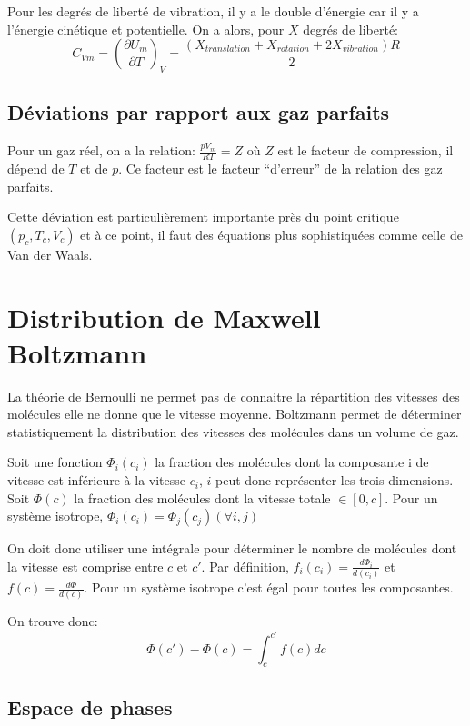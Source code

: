Pour les degrés de liberté de vibration, il y a le double d'énergie car il y a l'énergie cinétique et potentielle.
On a alors, pour $X$ degrés de liberté:
$$ C_{Vm} = (\frac{\partial U_m}{\partial T})_V = \frac{(X_{translation} + X_{rotation} + 2X_{vibration})R}{2}$$ 

\subsection{Déviations par rapport aux gaz parfaits}
Pour un gaz réel, on a la relation: $\frac{pV_m}{RT} = Z$ où $Z$ est le facteur de compression, il dépend de $T$ et de $p$. Ce facteur est le facteur ``d'erreur'' de la relation des gaz parfaits.

Cette déviation est particulièrement importante près du point critique $(p_c, T_c, V_c)$ et à ce point, il faut des équations plus sophistiquées comme celle de Van der Waals.

\section{Distribution de Maxwell Boltzmann}
La théorie de Bernoulli ne permet pas de connaitre la répartition des vitesses des molécules elle ne donne que le vitesse moyenne. Boltzmann permet de déterminer statistiquement la distribution des vitesses des molécules dans un volume de gaz.

Soit une fonction $\Phi_i(c_i)$ la fraction des molécules dont la composante i de vitesse est inférieure à la vitesse $c_i$, $i$ peut donc représenter les trois dimensions.
Soit $\Phi(c)$ la fraction des molécules dont la vitesse totale $\in [0, c]$.
Pour un système isotrope, $\Phi_i(c_i) = \Phi_j(c_j) (\forall i, j)$


On doit donc utiliser une intégrale pour déterminer le nombre de molécules dont la vitesse est comprise entre $c$ et $c'$.
Par définition, $f_i(c_i) = \frac{d\Phi_i}{d(c_i)}$ et $f(c) = \frac{d\Phi}{d(c)}$. Pour un système isotrope c'est égal pour toutes les composantes.

On trouve donc: $$\Phi(c') - \Phi(c) = \int_{c}^{c'}{f(c)dc}$$

\subsection{Espace de phases}


